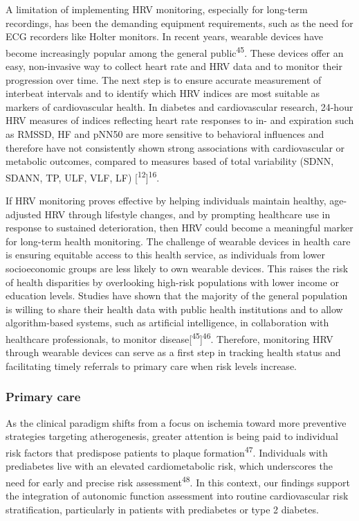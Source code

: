 \documentclass[
  a4paper,
  headsepline=true,
  open=any]{scrbook}
\begin{document}
A limitation of implementing HRV monitoring, especially for long-term
recordings, has been the demanding equipment requirements, such as the
need for ECG recorders like Holter monitors. In recent years, wearable
devices have become increasingly popular among the general
public\textsuperscript{45}. These devices offer an easy, non-invasive
way to collect heart rate and HRV data and to monitor their progression
over time. The next step is to ensure accurate measurement of interbeat
intervals and to identify which HRV indices are most suitable as markers
of cardiovascular health. In diabetes and cardiovascular research,
24-hour HRV measures of indices reflecting heart rate responses to in-
and expiration such as RMSSD, HF and pNN50 are more sensitive to
behavioral influences and therefore have not consistently shown strong
associations with cardiovascular or metabolic outcomes, compared to
measures based of total variability (SDNN, SDANN, TP, ULF, VLF, LF)
{[}\textsuperscript{12}{]}\textsuperscript{16}.

If HRV monitoring proves effective by helping individuals maintain
healthy, age-adjusted HRV through lifestyle changes, and by prompting
healthcare use in response to sustained deterioration, then HRV could
become a meaningful marker for long-term health monitoring. The
challenge of wearable devices in health care is ensuring equitable
access to this health service, as individuals from lower socioeconomic
groups are less likely to own wearable devices. This raises the risk of
health disparities by overlooking high-risk populations with lower
income or education levels. Studies have shown that the majority of the
general population is willing to share their health data with public
health institutions and to allow algorithm-based systems, such as
artificial intelligence, in collaboration with healthcare professionals,
to monitor disease{[}\textsuperscript{45}{]}\textsuperscript{46}.
Therefore, monitoring HRV through wearable devices can serve as a first
step in tracking health status and facilitating timely referrals to
primary care when risk levels increase.

\hypertarget{primary-care}{%
\subsubsection{Primary care}\label{primary-care}}

As the clinical paradigm shifts from a focus on ischemia toward more
preventive strategies targeting atherogenesis, greater attention is
being paid to individual risk factors that predispose patients to plaque
formation\textsuperscript{47}. Individuals with prediabetes live with an
elevated cardiometabolic risk, which underscores the need for early and
precise risk assessment\textsuperscript{48}. In this context, our
findings support the integration of autonomic function assessment into
routine cardiovascular risk stratification, particularly in patients
with prediabetes or type 2 diabetes.
\end{document}
